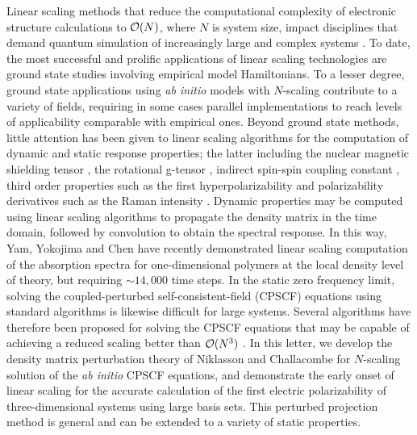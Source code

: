 \documentclass[prl,aps,preprint,showpacs,superbib]{revtex4}
\begin{document}
Linear scaling methods that reduce the computational complexity of 
electronic structure calculations to ${\cal O}(N)$, where $N$ is system size, 
impact disciplines that demand quantum simulation of increasingly large and complex systems
\cite{GGalli96,DBowler97,SGoedecker99,POrdejon00,VGogonea01,SWu02}. 
To date, the most successful and prolific applications of linear scaling technologies are
ground state studies involving empirical model Hamiltonians.  
To a lesser degree, ground state applications using {\em ab initio} models 
with $N$-scaling contribute to a variety of fields, requiring in some
cases parallel implementations to reach levels of applicability comparable with empirical ones. 
Beyond ground state methods, little attention has been given 
to linear scaling algorithms for the computation of dynamic and static response 
properties; the latter including the nuclear magnetic shielding tensor \cite{Pulay_1990}, 
the rotational g-tensor \cite{Helgaker_1996}, indirect spin-spin coupling constant 
\cite{Pennington_1991,Malkin_1996}, third order  properties such as the first hyperpolarizability 
\cite{Franky_1997} and polarizability derivatives such as the Raman intensity 
\cite{Lazzeri_2003,Champagne_2001}.  Dynamic  properties may be computed using linear scaling algorithms to propagate the density matrix \cite{SNomura97,CYam03} in 
the time domain, followed by convolution to obtain the spectral response.  In this way, 
Yam, Yokojima and Chen \cite{CYam03} have recently demonstrated linear scaling 
computation of the absorption spectra for one-dimensional polymers at the local 
density level of theory, but requiring $\sim 14,000$ time steps.  In the static zero frequency limit, 
solving the coupled-perturbed self-consistent-field (CPSCF) equations using standard algorithms is likewise difficult for
large systems.
Several algorithms have therefore been proposed for solving the CPSCF equations 
that may be capable of achieving a reduced scaling better than ${\cal O}(N^3)$ 
\cite{COchsenfeld97,HLarsen01a}.  In this letter, we develop 
the density matrix perturbation theory of Niklasson and Challacombe 
\cite{ANiklasson04} for $N$-scaling solution of the {\em ab initio} CPSCF equations, and 
demonstrate the early onset of linear scaling for the accurate calculation of the first electric 
polarizability of three-dimensional systems using large basis sets. This perturbed projection 
method is general and can be extended to a variety of static properties.
\end{document}
